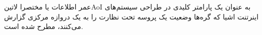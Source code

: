 
عمر اطلاعات یا مختصرا ‌لاتین{AoI} به عنوان یک پارامتر کلیدی
در طراحی سیستم‌های اینرتنت اشیا که گره‌ها وضعیت یک پروسه تحت نظارت را به یک دروازه مرکزی گزارش می‌کنند،
مطرح شده است.
